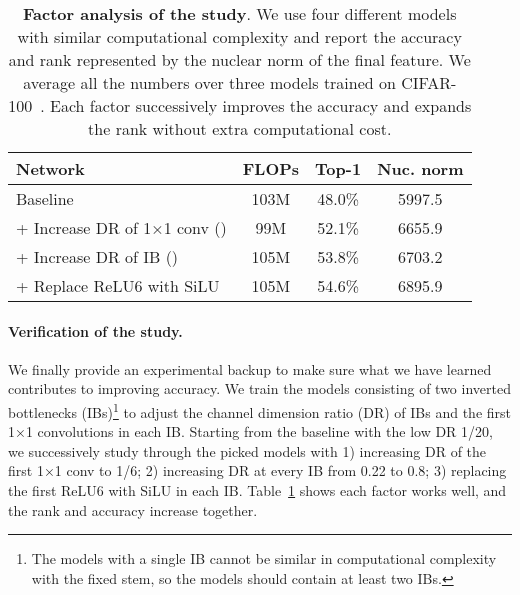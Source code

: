 \begin{table}[t]
\fontsize{8.5}{9.5}\selectfont
\centering
\tabcolsep=0.1cm
\hspace{-1.25mm}
\begin{tabular}{@{}l|c|c|c@{}}
Network & FLOPs & Top-1 & Nuc. norm \\
\midrule
Baseline  & 103M & 48.0\% & 5997.5  \\ 
+ Increase DR of 1×1 conv () & 99M & 52.1\% & 6655.9\\
+ Increase DR of IB () & 105M & 53.8\% & 6703.2\\ 
+ Replace ReLU6 with SiLU & 105M & 54.6\%  & 6895.9\\
\end{tabular}
\quad
\vspace{-3mm}
\caption{\small {\bf Factor analysis of the study}. We use four different models with similar computational complexity and report the accuracy and rank represented by the nuclear norm of the final feature. We average all the numbers over three models trained on CIFAR-100~\cite{cifar}. Each factor successively improves the accuracy and expands the rank without extra computational cost.}
\label{table:toy_exp1}
\vspace{-5mm}
\end{table}
 \vspace{-4mm}
\paragraph{Verification of the study.} We finally provide an experimental backup to make sure what we have learned contributes to improving accuracy. We train the models consisting of two inverted bottlenecks (IBs)\footnote{The models with a single IB cannot be similar in computational complexity with the fixed stem, so the models should contain at least two IBs.} to adjust the channel dimension ratio (DR) of IBs and the first 1×1 convolutions in each IB. Starting from the baseline with the low DR 1/20, we successively study through the picked models with 1) increasing DR of the first 1×1 conv to 1/6; 2) increasing DR at every IB from 0.22 to 0.8; 3) replacing the first ReLU6 with SiLU in each IB. Table~\ref{table:toy_exp1} shows each factor works well, and the rank and accuracy increase together.






